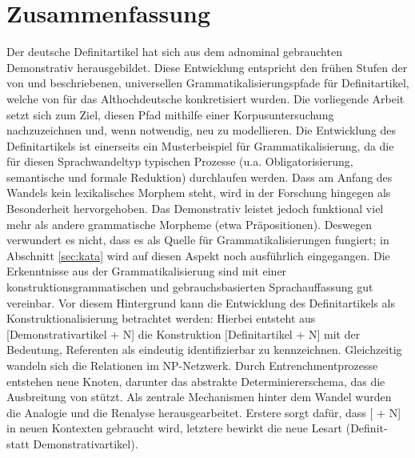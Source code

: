   
\section{Zusammenfassung}

Der deutsche Definitartikel hat sich aus dem adnominal gebrauchten Demonstrativ  herausgebildet. Diese Entwicklung entspricht den frühen Stufen der von \textcite{Greenberg1978} und \textcite{Lehmann2015} beschriebenen, universellen Grammatikalisierungspfade für Definitartikel, welche von \textcite{Schmuck2014} für das Althochdeutsche konkretisiert wurden. Die vorliegende Arbeit setzt sich zum Ziel, diesen Pfad mithilfe einer Korpusuntersuchung nachzuzeichnen und, wenn notwendig, neu zu modellieren. Die Entwicklung  des Definitartikels ist einerseits ein Musterbeispiel für Grammatikalisierung, da die für diesen Sprachwandeltyp typischen Prozesse (u.a. Obligatorisierung, semantische und formale Reduktion)  durchlaufen werden. Dass am Anfang des Wandels kein lexikalisches Morphem steht, wird in der Forschung hingegen als Besonderheit hervorgehoben. Das Demonstrativ leistet jedoch funktional viel mehr als andere grammatische Morpheme (etwa Präpositionen). Deswegen verwundert es nicht, dass es als Quelle für Grammatikalisierungen fungiert; in Abschnitt \ref{sec:kata} wird auf diesen Aspekt noch ausführlich eingegangen. Die Erkenntnisse aus der Grammatikalisierung sind mit einer konstruktionsgrammatischen und gebrauchsbasierten Sprachauffassung gut vereinbar. Vor diesem Hintergrund kann die Entwicklung des Definitartikels als Konstruktionalisierung betrachtet werden: Hierbei entsteht aus [Demonstrativartikel + N] die Konstruktion [Definitartikel + N] mit der Bedeutung, Referenten als eindeutig identifizierbar zu kennzeichnen. Gleichzeitig wandeln sich die Relationen im NP-Netzwerk. Durch Entrenchmentprozesse entstehen neue Knoten, darunter das abstrakte Determiniererschema, das die Ausbreitung von  stützt. Als zentrale Mechanismen hinter dem Wandel wurden die Analogie und die Renalyse herausgearbeitet. Erstere sorgt dafür, dass [ + N] in neuen Kontexten gebraucht wird, letztere bewirkt die neue Lesart (Definit- statt Demonstrativartikel). 
